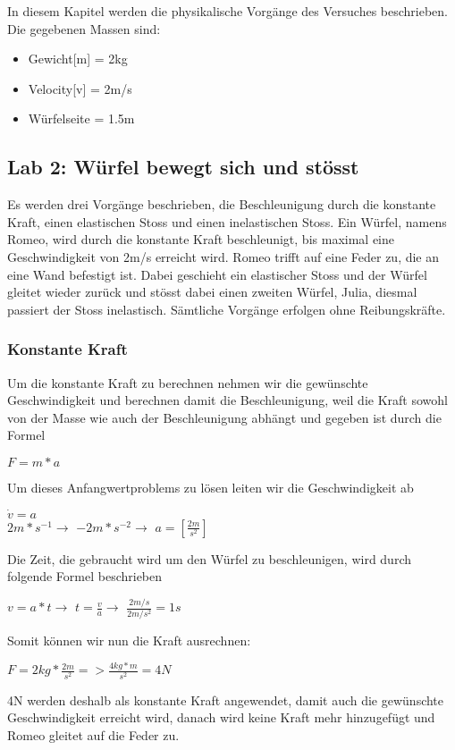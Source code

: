 \documentclass[../main.tex]{subfiles}
\begin{document}
In diesem Kapitel werden die physikalische Vorgänge des Versuches beschrieben. 
Die gegebenen Massen sind:
\begin{itemize}
	\item Gewicht[m] = 2kg
	\item Velocity[v] = 2m/s
	\item Würfelseite = 1.5m
\end{itemize}
\subsection{Lab 2: Würfel bewegt sich und stösst}
Es werden drei Vorgänge beschrieben, die Beschleunigung durch die konstante Kraft, einen elastischen Stoss und einen inelastischen Stoss.
Ein Würfel, namens Romeo, wird durch die konstante Kraft beschleunigt, bis maximal eine Geschwindigkeit von 2m/s erreicht wird.
Romeo trifft auf eine Feder zu, die an eine Wand befestigt ist.
Dabei geschieht ein elastischer Stoss und der Würfel gleitet wieder zurück und stösst dabei einen zweiten Würfel,
Julia, diesmal passiert der Stoss inelastisch. Sämtliche Vorgänge erfolgen ohne Reibungskräfte.
\subsubsection{Konstante Kraft}
Um die konstante Kraft zu berechnen nehmen wir die gewünschte Geschwindigkeit und berechnen damit die Beschleunigung,
weil die Kraft sowohl von der Masse wie auch der Beschleunigung abhängt und
gegeben ist durch die Formel%
\begin{mdframed}
		 $F = m*a$
\end{mdframed}
Um dieses Anfangwertproblems zu lösen leiten wir die Geschwindigkeit ab%
\begin{mdframed}
		 $\dot{v} = a$\\
$2m*s^{-1} \rightarrow$  $-2m*s^{-2} \rightarrow$  $a = [\frac{2m}{s^{2}}]$
\end{mdframed}
Die Zeit, die gebraucht wird um den Würfel zu beschleunigen, wird durch folgende Formel
beschrieben %
\begin{mdframed}
 $v=a*t \rightarrow$ $t=\frac{v}{a} \rightarrow$ $\frac{2m/s}{2m/s^{2}} = 1s$
\end{mdframed}
Somit können wir nun die Kraft ausrechnen:
\begin{mdframed}
$F = 2kg * \frac{2m}{s^{2}} => \frac{4kg*m}{s^{2}} = 4N$
\end{mdframed}
4N werden deshalb als konstante Kraft angewendet, damit auch die gewünschte Geschwindigkeit
erreicht wird, danach wird keine Kraft mehr hinzugefügt und Romeo gleitet auf die Feder zu.
\newpage
\end{document}
